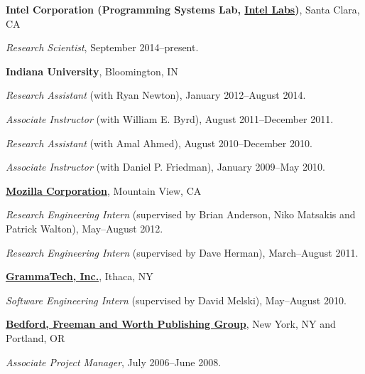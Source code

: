 \documentclass[10pt,letterpaper]{article}
\newenvironment{itemize*}
  {\begin{itemize}
      \setlength{\itemsep}{1pt}
      \setlength{\parskip}{3pt}
  }
  {\end{itemize}}
\begin{document}
\begin{itemize*}
\item{\textbf{Intel Corporation (Programming Systems Lab, \href{http://www.intel.com/content/www/us/en/research/intel-research.html}{Intel Labs})}, Santa Clara, CA}
  \begin{itemize*}
  \item \textit{Research Scientist}, September 2014--present.
  \end{itemize*}

\item{\textbf{Indiana University}, Bloomington, IN}
  \begin{itemize*}
  \item \textit{Research Assistant} (with Ryan Newton), January 2012--August 2014.
  \item \textit{Associate Instructor} (with William E. Byrd), August 2011--December 2011.
  \item \textit{Research Assistant} (with Amal Ahmed), August 2010--December 2010.
  \item \textit{Associate Instructor} (with Daniel P. Friedman), January 2009--May 2010.
  \end{itemize*}

\item \textbf{\href{http://www.mozilla.org}{Mozilla Corporation}},
  Mountain View, CA
  \begin{itemize*}
  \item \textit{Research Engineering Intern} (supervised by Brian Anderson, Niko Matsakis and Patrick Walton), May--August 2012.
  \item \textit{Research Engineering Intern} (supervised by Dave Herman), March--August 2011.
  \end{itemize*}

\item \textbf{\href{http://www.grammatech.com}{GrammaTech, Inc.}},
  Ithaca, NY
  \begin{itemize*}
  \item \textit{Software Engineering Intern} (supervised by David Melski), May--August 2010.
  \end{itemize*}

\item \textbf{\href{http://www.bfwpub.com}{Bedford, Freeman and Worth
      Publishing Group}}, New York, NY and Portland, OR
  \begin{itemize*}
  \item \textit{Associate Project Manager}, July 2006--June 2008.
  \end{itemize*}


\end{itemize*}
\end{document}
